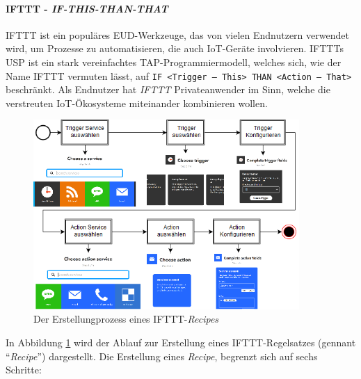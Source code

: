 \paragraph{IFTTT - \textit{IF-THIS-THAN-THAT}} IFTTT ist ein populäres \ac{EUD}-Werkzeuge, das von vielen Endnutzern verwendet wird, um Prozesse zu automatisieren, die auch \ac{IoT}-Geräte involvieren. IFTTTs \ac{USP} ist ein stark vereinfachtes \ac{TAP}-Programmiermodell, welches sich, wie der Name IFTTT vermuten lässt, auf \texttt{IF <Trigger -- This> THAN <Action -- That>} beschränkt. Als Endnutzer hat \textit{IFTTT} Privateanwender im Sinn, welche die verstreuten \ac{IoT}-Ökosysteme miteinander kombinieren wollen.
\begin{figure}[h]
    \centering
    \includegraphics[width=0.9\textwidth]{bilder/chapter2/iftttproz.png}
    \caption{Der Erstellungprozess eines IFTTT-\textit{Recipes}}
    \label{fig:iftttprocess}
\end{figure}
 In Abbildung \ref{fig:iftttprocess} wird der Ablauf zur Erstellung eines IFTTT-Regelsatzes (gennant "`\textit{Recipe}"') dargestellt. Die Erstellung eines \textit{Recipe}, begrenzt sich auf sechs Schritte:
